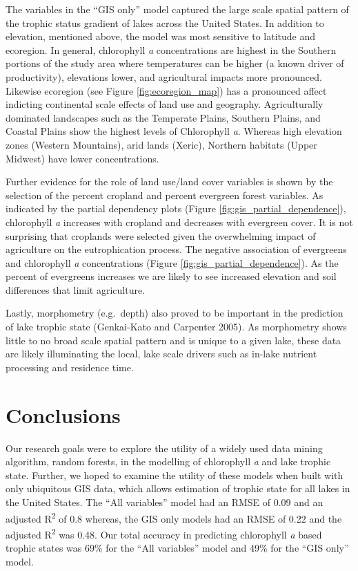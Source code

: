 \documentclass[11pt,]{article}
\begin{document}
The variables in the ``GIS only'' model captured the large scale spatial
pattern of the trophic status gradient of lakes across the United
States. In addition to elevation, mentioned above, the model was most
sensitive to latitude and ecoregion. In general, chlorophyll \emph{a}
concentrations are highest in the Southern portions of the study area
where temperatures can be higher (a known driver of productivity),
elevations lower, and agricultural impacts more pronounced. Likewise
ecoregion (see Figure \ref{fig:ecoregion_map}) has a pronounced affect
indicting continental scale effects of land use and geography.
Agriculturally dominated landscapes such as the Temperate Plains,
Southern Plains, and Coastal Plains show the highest levels of
Chlorophyll \emph{a}. Whereas high elevation zones (Western Mountains),
arid lands (Xeric), Northern habitats (Upper Midwest) have lower
concentrations.

Further evidence for the role of land use/land cover variables is shown
by the selection of the percent cropland and percent evergreen forest
variables. As indicated by the partial dependency plots (Figure
\ref{fig:gis_partial_dependence}), chlorophyll \emph{a} increases with
cropland and decreases with evergreen cover. It is not surprising that
croplands were selected given the overwhelming impact of agriculture on
the eutrophication process. The negative association of evergreens and
chlorophyll \emph{a} concentrations (Figure
\ref{fig:gis_partial_dependence}). As the percent of evergreens
increases we are likely to see increased elevation and soil differences
that limit agriculture.

Lastly, morphometry (e.g.~depth) also proved to be important in the
prediction of lake trophic state (Genkai-Kato and Carpenter 2005). As
morphometry shows little to no broad scale spatial pattern and is unique
to a given lake, these data are likely illuminating the local, lake
scale drivers such as in-lake nutrient processing and residence time.

\section{Conclusions}\label{conclusions}

Our research goals were to explore the utility of a widely used data
mining algorithm, random forests, in the modelling of chlorophyll
\emph{a} and lake trophic state. Further, we hoped to examine the
utility of these models when built with only ubiquitous GIS data, which
allows estimation of trophic state for all lakes in the United States.
The ``All variables'' model had an RMSE of 0.09 and an adjusted
R\textsuperscript{2} of 0.8 whereas, the GIS only models had an RMSE of
0.22 and the adjusted R\textsuperscript{2} was 0.48. Our total accuracy
in predicting chlorophyll \emph{a} based trophic states was 69\% for the
``All variables'' model and 49\% for the ``GIS only'' model.
\end{document}
